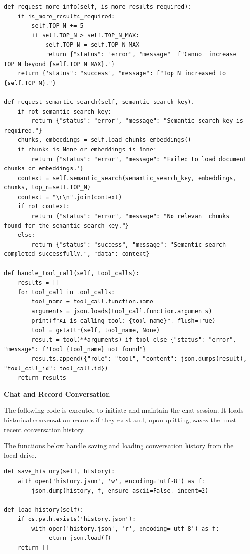 \begin{lstlisting}
def request_more_info(self, is_more_results_required):
    if is_more_results_required:
        self.TOP_N += 5
        if self.TOP_N > self.TOP_N_MAX:
            self.TOP_N = self.TOP_N_MAX
            return {"status": "error", "message": f"Cannot increase TOP_N beyond {self.TOP_N_MAX}."}
    return {"status": "success", "message": f"Top N increased to {self.TOP_N}."}

def request_semantic_search(self, semantic_search_key):
    if not semantic_search_key:
        return {"status": "error", "message": "Semantic search key is required."}
    chunks, embeddings = self.load_chunks_embeddings()
    if chunks is None or embeddings is None:
        return {"status": "error", "message": "Failed to load document chunks or embeddings."}
    context = self.semantic_search(semantic_search_key, embeddings, chunks, top_n=self.TOP_N)
    context = "\n\n".join(context)
    if not context:
        return {"status": "error", "message": "No relevant chunks found for the semantic search key."}
    else:
        return {"status": "success", "message": "Semantic search completed successfully.", "data": context}
        
def handle_tool_call(self, tool_calls):
    results = []
    for tool_call in tool_calls:
        tool_name = tool_call.function.name
        arguments = json.loads(tool_call.function.arguments)
        print(f"AI is calling tool: {tool_name}", flush=True)
        tool = getattr(self, tool_name, None)
        result = tool(**arguments) if tool else {"status": "error", "message": f"Tool {tool_name} not found"}
        results.append({"role": "tool", "content": json.dumps(result), "tool_call_id": tool_call.id})
    return results
\end{lstlisting}

\vspace{0.1in}
\noindent \textbf{Chat and Record Conversation}
\vspace{0.1in}

The following code is executed to initiate and maintain the chat session. It loads historical conversation records if they exist and, upon quitting, saves the most recent conversation history.

The functions below handle saving and loading conversation history from the local drive.

\begin{lstlisting}
def save_history(self, history):
    with open('history.json', 'w', encoding='utf-8') as f:
        json.dump(history, f, ensure_ascii=False, indent=2)

def load_history(self):
    if os.path.exists('history.json'):
        with open('history.json', 'r', encoding='utf-8') as f:
            return json.load(f)
    return []
\end{lstlisting}

